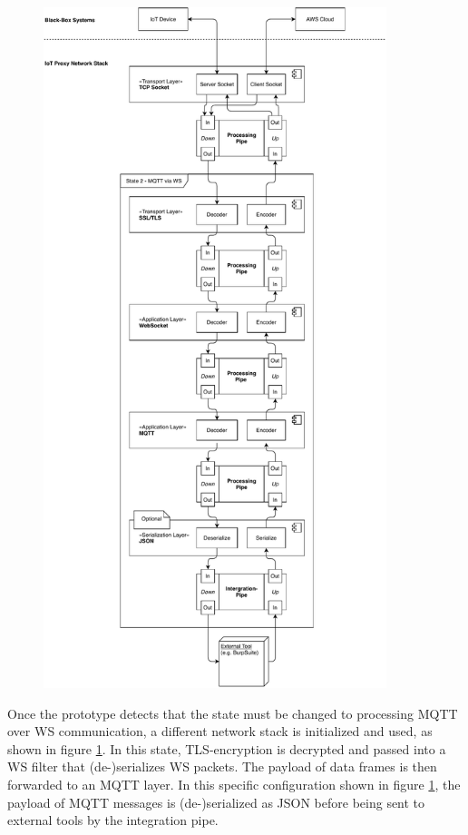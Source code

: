 \begin{figure}[h!]
    \centering
    \includegraphics[width=10cm]{img/ch04/Architecture - PipesFilters 2.pdf}
    \label{fig:app-diag-pipesfilters-2}
\end{figure}
Once the prototype detects that the state must be changed to processing \ac{MQTT} over \ac{WS} communication, a different network stack is initialized and used, as shown in figure \ref{fig:app-diag-pipesfilters-2}. In this state, TLS-encryption is decrypted and passed into a \ac{WS} filter that (de-)serializes \ac{WS} packets. The payload of data frames is then forwarded to an \ac{MQTT} layer. In this specific configuration shown in figure \ref{fig:app-diag-pipesfilters-2}, the payload of \ac{MQTT} messages is (de-)serialized as \ac{JSON} before being sent to external tools by the integration pipe.

